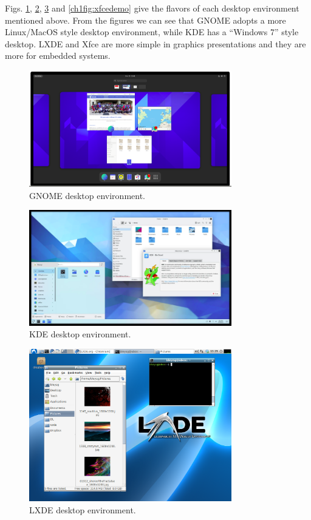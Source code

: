 Figs. \ref{ch1fig:gnomedemo}, \ref{ch1fig:kdedemo}, \ref{ch1fig:lxdedemo} and \ref{ch1fig:xfcedemo} give the flavors of each desktop environment mentioned above. From the figures we can see that GNOME adopts a more Linux/MacOS style desktop environment, while KDE has a ``Windows 7'' style desktop. LXDE and Xfce are more simple in graphics presentations and they are more for embedded systems.

\begin{figure}
	\centering
	\includegraphics[width=250pt]{chapters/chapter1/figures/gnome_demo.png}
	\caption{GNOME desktop environment.} \label{ch1fig:gnomedemo}
\end{figure}

\begin{figure}
	\centering
	\includegraphics[width=250pt]{chapters/chapter1/figures/kde_demo.png}
	\caption{KDE desktop environment.} \label{ch1fig:kdedemo}
\end{figure}

\begin{figure}
	\centering
	\includegraphics[width=250pt]{chapters/chapter1/figures/lxde_demo.png}
	\caption{LXDE desktop environment.} \label{ch1fig:lxdedemo}
\end{figure}

